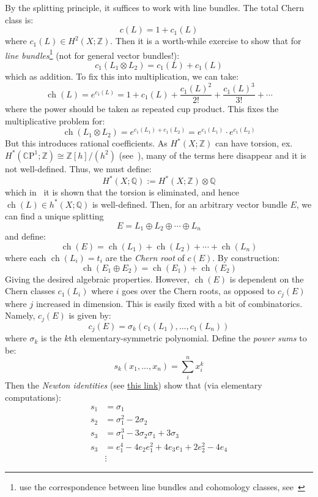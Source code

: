 \documentclass{book}
\newcommand{\Q}{{\mathbb{Q}}}
\newcommand{\Z}{{\mathbb{Z}}}
\newcommand{\CP}{\mathbb{C}\mathrm{P}}
\newcommand{\ch}{{\operatorname{ch}}}
\begin{document}
By the splitting principle, it suffices to work with line bundles. The total Chern class is:
\[
  c(L) = 1 + c_1(L)
\]
where $c_1(L) \in H^2(X; \Z)$. Then it is a worth-while exercise to show that for \emph{line
bundles}\footnote{use the correspondence between line bundles and cohomology classes,
see~\cite{NateKTheory}} (not for general vector bundles!):
\[
  c_1(L_1\otimes L_2) = c_1(L) + c_1(L)
\]
which as addition. To fix this into multiplication, we can take:
\[
  \ch(L) = e^{c_1(L)} = 1 + c_1(L) + \frac{c_1(L)^2}{2!} + \frac{c_1(L)^3}{3!} + \cdots
\]
where the power should be taken as repeated cup product. This fixes the multiplicative problem
for:
\[
\ch(L_1\otimes L_2) = e^{c_1(L_1) + c_1(L_2)} = e^{c_1(L_1)}\cdot e^{c_1(L_2)}
\]
But this introduces rational coefficients. As $H^*(X; \Z)$ can have torsion, ex. $H^*(\CP^1;\Z) \cong
\Z[h]/(h^2)$ (see~\cite[appendix]{NateAlgTop}), many of the terms here disappear and it is not well-defined.
Thus, we must define:
\[
  H^*(X; \Q) := H^*(X; \Z)\otimes \Q
\]
which in~\cite{NateAlgebra} it is shown that the torsion is eliminated, and hence $\ch(L) \in h^*(X; \Q)$ is
well-defined. Then, for an arbitrary vector bundle $E$, we can find a unique splitting
\[
  E = L_1\oplus L_2\oplus \cdots \oplus L_n
\]
and define:
\[
  \ch(E) = \ch(L_1) + \ch(L_2) + \cdots + \ch(L_n)
\]
where each $\ch(L_i) = t_i$ are the \emph{Chern root} of $c(E)$.  By construction:
\[
  \ch(E_1\oplus E_2) = \ch(E_1) + \ch(E_2)
\]
Giving the desired algebraic properties. However, $\ch(E)$ is dependent on the Chern classes $c_1(L_i)$
where $i$ goes over the Chern roots, as opposed to $c_j(E)$ where $j$ increased in dimension. This is
easily fixed with a bit of combinatorics. Namely, $c_j(E)$ is given by:
\[
  c_j(E) = \sigma_k(c_1(L_1), ..., c_1(L_n))
\]
where $\sigma_k$ is the $k$th elementary-symmetric polynomial. Define the \emph{power sums} to be:
\[
  s_k(x_1, ..., x_n) = \sum_i^n x_i^k
\]
Then the \emph{Newton identities} (see
\href{https://en.wikipedia.org/wiki/Newton%27s_identities#Expressing_power_sums_in_terms_of_elementary_symmetric_polynomials}{this
link}) show that (via elementary computations):
\begin{align*}
  s_1 &= \sigma_1\\
  s_2 &= \sigma_1^2 - 2\sigma_2\\
  s_3 &= \sigma_1^3  -3\sigma_2\sigma_1  + 3 \sigma_3\\
  s_3 &= e_1^4 - 4e_2e_1^2 + 4e_3e_1 + 2e_2^2 - 4e_4\\
      &\vdots
\end{align*}
\end{document}
